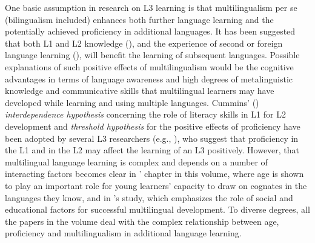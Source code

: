 \documentclass[output=paper,colorlinks,citecolor=brown,nonflat]{langsci/langscibook}
\begin{document}
One basic assumption in research on L3 learning is that multilingualism per se (bilingualism included) enhances both further language learning and the potentially achieved proficiency in additional languages. It has been suggested that both L1 and L2 knowledge (\citealt{FlynnFoleyVinnitskaya2004, BerkesFlynn2016}), and the experience of second or foreign language learning (\citealt{Hufeisen2005, Jessner2006}), will benefit the learning of subsequent languages. Possible explanations of such positive effects of multilingualism would be the cognitive advantages in terms of language awareness and high degrees of metalinguistic knowledge and communicative skills that multilingual learners may have developed while learning and using multiple languages. Cummins’ (\citeyear{Cummins1976, Cummins1991}) \textit{interdependence hypothesis} concerning the role of literacy skills in L1 for L2 development and \textit{threshold hypothesis} for the positive effects of proficiency have been adopted by several L3 researchers (e.g., \citealt{Cenoz2003}), who suggest that proficiency in the L1 and in the L2 may affect the learning of an L3 positively. However, that multilingual language learning is complex and depends on a number of interacting factors becomes clear in \citeauthor{chapters/munoz}’ chapter in this volume, where age is shown to play an important role for young learners’ capacity to draw on cognates in the languages they know, and in \citeauthor{chapters/pfenninger}’s study, which emphasizes the role of social and educational factors for successful multilingual development. To diverse degrees, all the papers in the volume deal with the complex relationship between age, proficiency and multilingualism in additional language learning.
\end{document}
